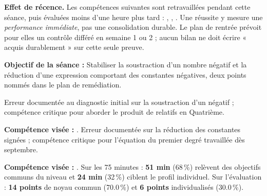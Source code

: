 \documentclass[10pt,a4paper]{article}
\begin{document}
\begin{warningbox}\textbf{Effet de récence.} Les compétences suivantes sont retravaillées pendant cette séance, puis évaluées moins d'une heure plus tard : , , . Une réussite y mesure une \emph{performance immédiate}, pas une consolidation durable. Le plan de rentrée prévoit pour elles un contrôle différé en semaine 1 ou 2 ; aucun bilan ne doit écrire « acquis durablement » sur cette seule preuve.\end{warningbox}
\begin{goalbox}\textbf{Objectif de la séance :} Stabiliser la soustraction d'un nombre négatif et la réduction d'une expression comportant des constantes négatives, deux points nommés dans le plan de remédiation.\end{goalbox}
Erreur documentée au diagnostic initial sur la soustraction d'un négatif ; compétence critique pour aborder le produit de relatifs en Quatrième.
\par\vspace{1mm}\textbf{Compétence visée :} .
Erreur documentée sur la réduction des constantes signées ; compétence critique pour l'équation du premier degré travaillée dès septembre.
\par\vspace{1mm}\textbf{Compétence visée :} .
Sur les 75 minutes : \textbf{51 min} (68\,\%) relèvent des objectifs communs du niveau et \textbf{24 min} (32\,\%) ciblent le profil individuel. Sur l'évaluation : \textbf{14 points} de noyau commun (70.0\,\%) et \textbf{6 points} individualisés (30.0\,\%).
\newpage{}
\end{document}
